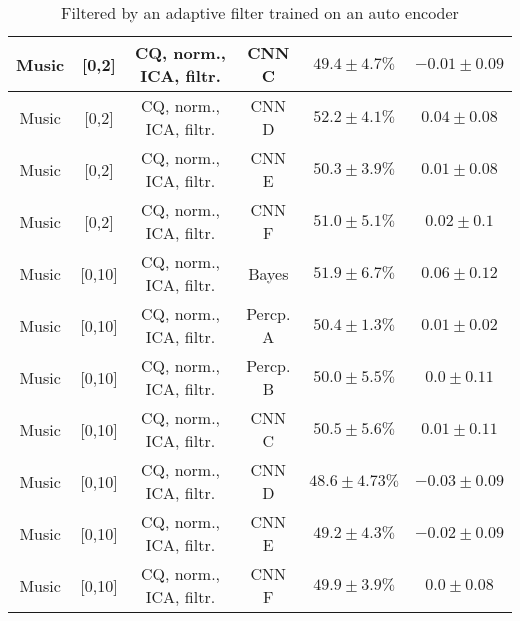 \begin{table}[!htb]
{\begin{tabular}{c|c|c|c|c|c}
    \hline
    Music               & [0,2]                                         & \scriptsize{CQ, norm., ICA, filtr.}        & CNN C                 &  $49.4 \pm 4.7\%$     & $-0.01 \pm 0.09$\\  
    \hline
    Music               & [0,2]                                         & \scriptsize{CQ, norm., ICA, filtr.}        & CNN D                 &  $52.2 \pm 4.1\%$     & $0.04 \pm 0.08$\\  
    \hline
    Music               & [0,2]                                         & \scriptsize{CQ, norm., ICA, filtr.}        & CNN E                 &  $50.3 \pm 3.9\%$     & $0.01 \pm 0.08$\\  
    \hline
    Music               & [0,2]                                         & \scriptsize{CQ, norm., ICA, filtr.}        & CNN F                 &  $51.0 \pm 5.1\%$     & $0.02 \pm 0.1$\\  
    \hline
    Music               & [0,10]                                        & \scriptsize{CQ, norm., ICA, filtr.}        & Bayes                 &  $51.9 \pm 6.7\%$     & $0.06 \pm 0.12$\\  
    \hline
    Music               & [0,10]                                        & \scriptsize{CQ, norm., ICA, filtr.}        & Percp. A              &  $50.4 \pm 1.3\%$     & $0.01 \pm 0.02$\\ 
    \hline
    Music               & [0,10]                                        & \scriptsize{CQ, norm., ICA, filtr.}        & Percp. B              &  $50.0 \pm 5.5\%$     & $0.0 \pm 0.11$\\  
    \hline
    Music               & [0,10]                                        & \scriptsize{CQ, norm., ICA, filtr.}        & CNN C                 &  $50.5 \pm 5.6\%$     & $0.01 \pm 0.11$\\ 
    \hline
    Music               & [0,10]                                        & \scriptsize{CQ, norm., ICA, filtr.}        & CNN D                 &  $48.6 \pm 4.73\%$   & $-0.03 \pm 0.09$\\
    \hline
    Music               & [0,10]                                        & \scriptsize{CQ, norm., ICA, filtr.}        & CNN E                 &  $49.2 \pm 4.3\%$     & $-0.02 \pm 0.09$\\
    \hline
    Music               & [0,10]                                        & \scriptsize{CQ, norm., ICA, filtr.}        & CNN F                 &  $49.9 \pm 3.9\%$     & $0.0 \pm 0.08$\\  
    \hline
    \end{tabular}
}
\caption{Filtered by an adaptive filter trained on an auto encoder}
\label{tab:sound-filtered-app}
\end{table}